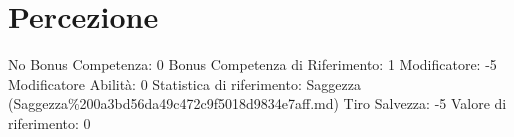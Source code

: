 \section{Percezione}\label{percezione}

\begin{description}
\tightlist
\item[Tags: ABI]
No Bonus Competenza: 0 Bonus Competenza di Riferimento: 1 Modificatore:
-5 Modificatore Abilità: 0 Statistica di riferimento: Saggezza
(Saggezza\%200a3bd56da49c472c9f5018d9834e7aff.md) Tiro Salvezza: -5
Valore di riferimento: 0
\end{description}
